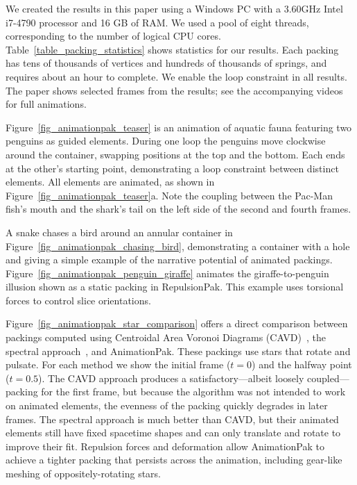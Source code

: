 We created the results in this paper using a Windows PC with a 
3.60GHz Intel i7-4790 processor and 16 GB of RAM.  We used a pool
of eight threads, corresponding to the number of logical CPU cores.
Table~\ref{table_packing_statistics} shows statistics for our results.
Each packing has tens of thousands of vertices and hundreds of thousands
of springs, and requires about an hour to complete.
We enable the loop constraint in all results.  The paper shows selected frames from the
results; see the accompanying videos for full animations.


Figure~\ref{fig_animationpak_teaser} is an animation of aquatic fauna featuring two
penguins as guided elements.  During one loop the penguins move clockwise
around the container, swapping positions at the top and the bottom.
Each ends at the other's starting point, demonstrating a loop constraint
between distinct elements.  All elements are animated, as shown in 
Figure~\ref{fig_animationpak_teaser}a.  Note the coupling between the Pac-Man fish's
mouth and the shark's tail on the left side of the second and fourth frames.

A snake chases a bird around an annular container in 
Figure~\ref{fig_animationpak_chasing_bird}, demonstrating a container with a hole
and giving a simple example of the narrative potential of animated
packings.  Figure~\ref{fig_animationpak_penguin_giraffe} animates the giraffe-to-penguin
illusion shown as a static packing in RepulsionPak.  This example
uses torsional forces to control slice orientations.

Figure~\ref{fig_animationpak_star_comparison} offers a direct comparison between
packings computed using Centroidal Area Voronoi Diagrams
(CAVD)~\cite{Smith2005}, the spectral approach~\cite{Dalal2006}, and
AnimationPak.
These packings use stars that rotate and pulsate.
For each method we show the initial frame ($t=0$) and the halfway point
($t=0.5$).  The CAVD approach produces a satisfactory---albeit
loosely coupled---packing for the first frame, but because the 
algorithm was not intended to work on animated elements, 
the evenness of the packing quickly degrades in later frames.
The spectral approach is much better
than CAVD, but their animated elements still have fixed spacetime shapes
and can only translate and rotate to improve their fit. 
Repulsion
forces and deformation allow AnimationPak to achieve a tighter packing
that persists across the animation, including gear-like meshing of
oppositely-rotating stars.

